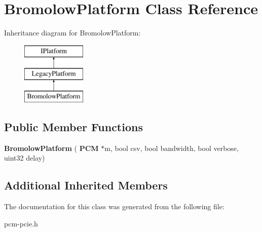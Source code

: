 \section{Bromolow\+Platform Class Reference}
\label{classBromolowPlatform}
Inheritance diagram for Bromolow\+Platform\+:\begin{figure}[H]
\begin{center}
\leavevmode
\includegraphics[height=3.000000cm]{classBromolowPlatform}
\end{center}
\end{figure}
\subsection*{Public Member Functions}
\begin{DoxyCompactItemize}
\item 
\mbox{\label{classBromolowPlatform_a2f7dbb7dae860ba38da120f2a3c93975}} 
{\bfseries Bromolow\+Platform} (\textbf{ P\+CM} $\ast$m, bool csv, bool bandwidth, bool verbose, uint32 delay)
\end{DoxyCompactItemize}
\subsection*{Additional Inherited Members}


The documentation for this class was generated from the following file\+:\begin{DoxyCompactItemize}
\item 
pcm-\/pcie.\+h\end{DoxyCompactItemize}
